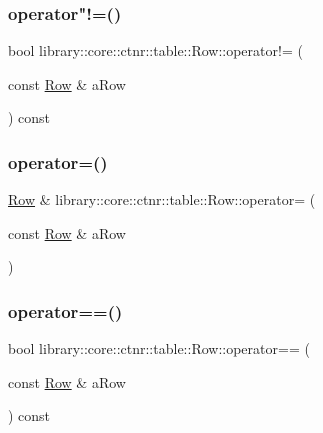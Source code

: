 \subsubsection{\texorpdfstring{operator"!=()}{operator!=()}}
{\footnotesize\ttfamily bool library\+::core\+::ctnr\+::table\+::\+Row\+::operator!= (\begin{DoxyParamCaption}\item[{const \hyperlink{classlibrary_1_1core_1_1ctnr_1_1table_1_1_row}{Row} \&}]{a\+Row }\end{DoxyParamCaption}) const}

\mbox{\label{classlibrary_1_1core_1_1ctnr_1_1table_1_1_row_a6d6582a7ac4eba2bb7d6d34b1fa79b51}} 
\subsubsection{\texorpdfstring{operator=()}{operator=()}}
{\footnotesize\ttfamily \hyperlink{classlibrary_1_1core_1_1ctnr_1_1table_1_1_row}{Row} \& library\+::core\+::ctnr\+::table\+::\+Row\+::operator= (\begin{DoxyParamCaption}\item[{const \hyperlink{classlibrary_1_1core_1_1ctnr_1_1table_1_1_row}{Row} \&}]{a\+Row }\end{DoxyParamCaption})}

\mbox{\label{classlibrary_1_1core_1_1ctnr_1_1table_1_1_row_a0c4f807d7c22544609314c366a494ed8}} 
\subsubsection{\texorpdfstring{operator==()}{operator==()}}
{\footnotesize\ttfamily bool library\+::core\+::ctnr\+::table\+::\+Row\+::operator== (\begin{DoxyParamCaption}\item[{const \hyperlink{classlibrary_1_1core_1_1ctnr_1_1table_1_1_row}{Row} \&}]{a\+Row }\end{DoxyParamCaption}) const}

